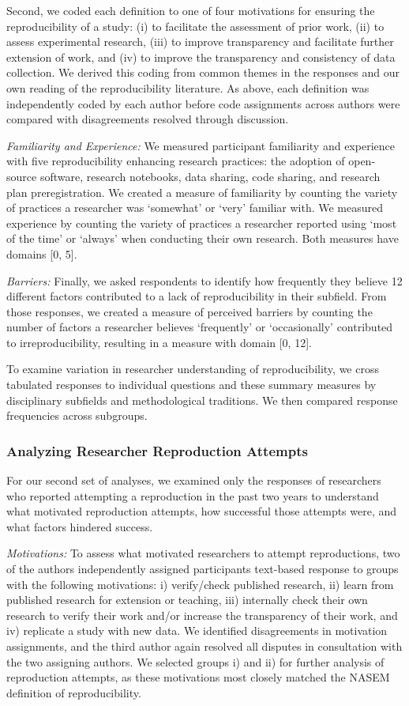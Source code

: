 \documentclass[]{interact}
\theoremstyle{plain}%
\theoremstyle{definition}
\theoremstyle{remark}
\begin{document}
Second, we coded each definition to one of four motivations for ensuring the reproducibility of a study: (i) to facilitate the assessment of prior work, (ii) to assess experimental research, (iii) to improve transparency and facilitate further extension of work, and (iv) to improve the transparency and consistency of data collection.
We derived this coding from common themes in the responses and our own reading of the reproducibility literature.
As above, each definition was independently coded by each author before code assignments across authors were compared with disagreements resolved through discussion.

\textit{Familiarity and Experience:} We measured participant familiarity and experience with five reproducibility enhancing research practices: the adoption of open-source software, research notebooks, data sharing, code sharing, and research plan preregistration. 
We created a measure of familiarity by counting the variety of practices a researcher was `somewhat' or `very' familiar with.
We measured experience by counting the variety of practices a researcher reported using `most of the time' or `always' when conducting their own research. 
Both measures have domains [0, 5]. 

\textit{Barriers:} Finally, we asked respondents to identify how frequently they believe 12 different factors contributed to a lack of reproducibility in their subfield. 
From those responses, we created a measure of perceived barriers by counting the number of factors a researcher believes `frequently' or `occasionally' contributed to irreproducibility, resulting in a measure with domain [0, 12].

To examine variation in researcher understanding of reproducibility, we cross tabulated responses to individual questions and these summary measures by disciplinary subfields and methodological traditions. 
We then compared response frequencies across subgroups.

\subsubsection*{Analyzing Researcher Reproduction Attempts}
\noindent For our second set of analyses, we examined only the responses of researchers who reported attempting a reproduction in the past two years to understand what motivated reproduction attempts, how successful those attempts were, and what factors hindered success.

\textit{Motivations:} To assess what motivated researchers to attempt reproductions, two of the authors independently assigned participants text-based response to groups with the following motivations: i) verify/check published research, ii) learn from published research for extension or teaching, iii) internally check their own research to verify their work and/or increase the transparency of their work, and iv) replicate a study with new data.
We identified disagreements in motivation assignments, and the third author again resolved all disputes in consultation with the two assigning authors.
We selected groups i) and ii) for further analysis of reproduction attempts, as these motivations most closely matched the NASEM definition of reproducibility. 
\end{document}
